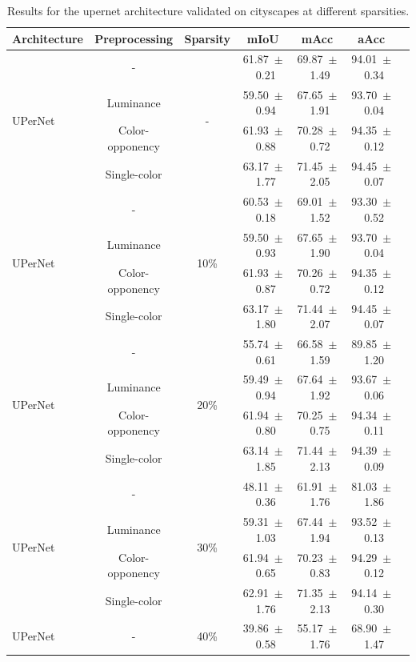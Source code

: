 \begin{table}[h]
\centering
\caption{Results for the upernet architecture validated on cityscapes at different sparsities.}
\begin{tabular}{@{}lccc ccc@{}}
\toprule
Architecture & Preprocessing & Sparsity & mIoU & mAcc & aAcc \\
\midrule

\multirow{4}{*}{UPerNet} & - & \multirow{4}{*}{-} & 61.87~$\pm$~0.21 & 69.87~$\pm$~1.49 & 94.01~$\pm$~0.34 \\
& Luminance & & 59.50~$\pm$~0.94 & 67.65~$\pm$~1.91 & 93.70~$\pm$~0.04 \\
& Color-opponency & & 61.93~$\pm$~0.88 & 70.28~$\pm$~0.72 & 94.35~$\pm$~0.12 \\
& Single-color & & 63.17~$\pm$~1.77 & 71.45~$\pm$~2.05 & 94.45~$\pm$~0.07 \\
\midrule
\multirow{4}{*}{UPerNet} & - & \multirow{4}{*}{10\%} & 60.53~$\pm$~0.18 & 69.01~$\pm$~1.52 & 93.30~$\pm$~0.52 \\
& Luminance & & 59.50~$\pm$~0.93 & 67.65~$\pm$~1.90 & 93.70~$\pm$~0.04 \\
& Color-opponency & & 61.93~$\pm$~0.87 & 70.26~$\pm$~0.72 & 94.35~$\pm$~0.12 \\
& Single-color & & 63.17~$\pm$~1.80 & 71.44~$\pm$~2.07 & 94.45~$\pm$~0.07 \\
\midrule
\multirow{4}{*}{UPerNet} & - & \multirow{4}{*}{20\%} & 55.74~$\pm$~0.61 & 66.58~$\pm$~1.59 & 89.85~$\pm$~1.20 \\
& Luminance & & 59.49~$\pm$~0.94 & 67.64~$\pm$~1.92 & 93.67~$\pm$~0.06 \\
& Color-opponency & & 61.94~$\pm$~0.80 & 70.25~$\pm$~0.75 & 94.34~$\pm$~0.11 \\
& Single-color & & 63.14~$\pm$~1.85 & 71.44~$\pm$~2.13 & 94.39~$\pm$~0.09 \\
\midrule
\multirow{4}{*}{UPerNet} & - & \multirow{4}{*}{30\%} & 48.11~$\pm$~0.36 & 61.91~$\pm$~1.76 & 81.03~$\pm$~1.86 \\
& Luminance & & 59.31~$\pm$~1.03 & 67.44~$\pm$~1.94 & 93.52~$\pm$~0.13 \\
& Color-opponency & & 61.94~$\pm$~0.65 & 70.23~$\pm$~0.83 & 94.29~$\pm$~0.12 \\
& Single-color & & 62.91~$\pm$~1.76 & 71.35~$\pm$~2.13 & 94.14~$\pm$~0.30 \\
\midrule
\multirow{4}{*}{UPerNet} & - & \multirow{4}{*}{40\%} & 39.86~$\pm$~0.58 & 55.17~$\pm$~1.76 & 68.90~$\pm$~1.47 \\

\end{tabular}
\end{table}
